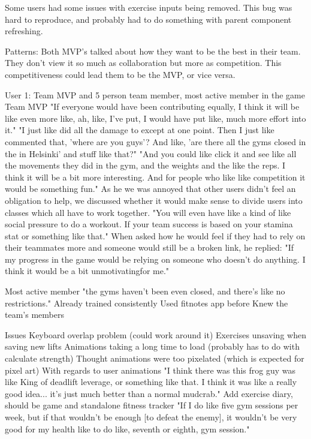 \documentclass{l4proj}
\begin{document}
Some users had some issues with exercise inputs being removed. This bug was hard to reproduce, and probably had to do something with parent component refreshing. 

Patterns:
  Both MVP's talked about how they want to be the best in their team. They don't view it so much as collaboration but more as competition. This competitiveness could lead  them to be the MVP, or vice versa.


User 1: Team MVP and 5 person team member, most active member in the game
  Team MVP
    "If everyone would have been contributing equally, I think it will be like even more like, ah, like, I've put, I would have put like, much more effort into it."
    "I just like did all the damage to except at one point. Then I just like commented that, 'where are you guys'? And like, 'are there all the gyms closed in the in Helsinki' and stuff like that?"
    "And you could like click it and see like all the movements they did in the gym, and the weights and the like the reps. I think it will be a bit more interesting. And for people who like like competition it would be something fun."
    As he we was annoyed that other users didn't feel an obligation to help, we discussed whether it would make sense to divide users into classes which all have to work together.  "You will even have like a kind of like social pressure to do a workout. If your team success is based on your stamina stat or something like that." When asked how he would feel if they had to rely on their teammates more and someone would still be a broken link, he replied: "If my progress in the game would be relying on someone who doesn't do anything. I think it would be a bit unmotivatingfor me."

  Most active member  
    "the gyms haven't been even closed, and there's like no restrictions."
    Already trained consistently
    Used fitnotes app before
    Knew the team's members

  Issues
    Keyboard overlap problem (could work around it)
    Exercises unsaving when saving new lifts
    Animations taking a long time to load (probably has to do with calculate strength)
    Thought animations were too pixelated (which is expected for pixel art)
    With regards to user animations
      "I think there was this frog guy was like King of deadlift leverage, or something like that. I think it was like a really good idea... it's just much better than a normal mudcrab." 
    Add exercise diary, should be game and standalone fitness tracker
    "If I do like five gym sessions per week, but if that wouldn't be enough [to defeat the enemy], it wouldn't be very good for my health like to do like, seventh or eighth, gym session."
\end{document}
